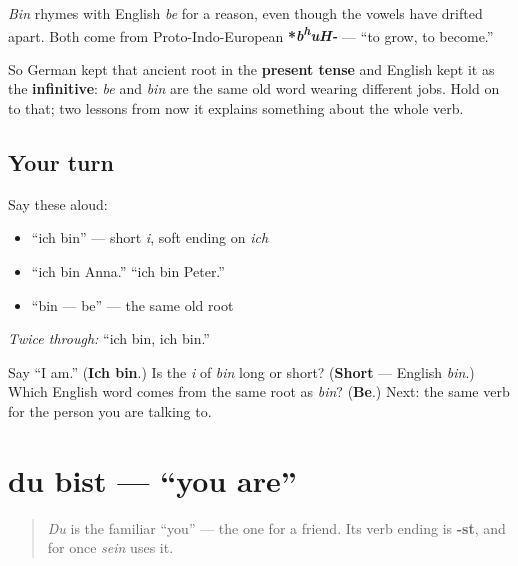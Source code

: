 \begin{cousinweb}
\emph{Bin} rhymes with English \emph{be} for a reason, even though the vowels have drifted apart. Both come from Proto-Indo-European \textbf{*\emph{b\textsuperscript{h}uH-}} — \textquotedblleft{}to grow, to become.\textquotedblright{}

So German kept that ancient root in the \textbf{present tense} and English kept it as the \textbf{infinitive}: \emph{be} and \emph{bin} are the same old word wearing different jobs. Hold on to that; two lessons from now it explains something about the whole verb.
\end{cousinweb}

\subsection*{Your turn}
Say these aloud:

\begin{itemize}
\raggedright
  \item \textquotedblleft{}ich bin\textquotedblright{} — short \emph{i}, soft ending on \emph{ich}
  \item \textquotedblleft{}ich bin Anna.\textquotedblright{} \textquotedblleft{}ich bin Peter.\textquotedblright{}
  \item \textquotedblleft{}bin — be\textquotedblright{} — the same old root
\end{itemize}

\emph{Twice through:} \textquotedblleft{}ich bin, ich bin.\textquotedblright{}

\begin{tcolorbox}[breakable,colback=teal!4,colframe=teal!35!black,title={Before you move on}]
Say \textquotedblleft{}I am.\textquotedblright{} (\textbf{Ich bin}.) Is the \emph{i} of \emph{bin} long or short? (\textbf{Short} — English \emph{bin}.) Which English word comes from the same root as \emph{bin}? (\textbf{Be}.) Next: the same verb for the person you are talking to.
\end{tcolorbox}
\section[du bist]{du bist — \textquotedblleft{}you are\textquotedblright{}}

\label{lesson:GE-C16-du-bist}



\begin{quote}
\emph{Du} is the familiar \textquotedblleft{}you\textquotedblright{} — the one for a friend. Its verb ending is \textbf{-st}, and for once \emph{sein} uses it.
\end{quote}

